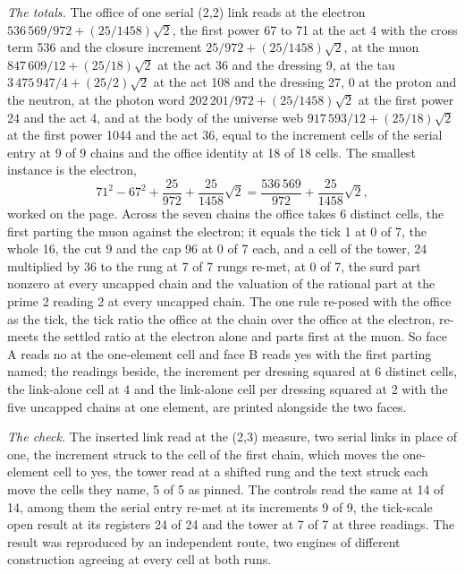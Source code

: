\begin{chproof}
\textit{The totals.} The office of one serial (2,2) link reads at the electron $536\,569/972 + (25/1458)\sqrt{2}$, the first power 67 to 71 at the act 4 with the cross term 536 and the closure increment $25/972 + (25/1458)\sqrt{2}$, at the muon $847\,609/12 + (25/18)\sqrt{2}$ at the act 36 and the dressing 9, at the tau $3\,475\,947/4 + (25/2)\sqrt{2}$ at the act 108 and the dressing 27, 0 at the proton and the neutron, at the photon word $202\,201/972 + (25/1458)\sqrt{2}$ at the first power 24 and the act 4, and at the body of the universe web $917\,593/12 + (25/18)\sqrt{2}$ at the first power 1044 and the act 36, equal to the increment cells of the serial entry at 9 of 9 chains and the office identity at 18 of 18 cells. The smallest instance is the electron,
\begin{equation}
71^2 - 67^2 + \frac{25}{972} + \frac{25}{1458}\sqrt{2} = \frac{536\,569}{972} + \frac{25}{1458}\sqrt{2},
\end{equation}
worked on the page. Across the seven chains the office takes 6 distinct cells, the first parting the muon against the electron; it equals the tick 1 at 0 of 7, the whole 16, the cut 9 and the cap 96 at 0 of 7 each, and a cell of the tower, 24 multiplied by 36 to the rung at 7 of 7 rungs re-met, at 0 of 7, the surd part nonzero at every uncapped chain and the valuation of the rational part at the prime 2 reading 2 at every uncapped chain. The one rule re-posed with the office as the tick, the tick ratio the office at the chain over the office at the electron, re-meets the settled ratio at the electron alone and parts first at the muon. So face A reads no at the one-element cell and face B reads yes with the first parting named; the readings beside, the increment per dressing squared at 6 distinct cells, the link-alone cell at 4 and the link-alone cell per dressing squared at 2 with the five uncapped chains at one element, are printed alongside the two faces.

\textit{The check.} The inserted link read at the (2,3) measure, two serial links in place of one, the increment struck to the cell of the first chain, which moves the one-element cell to yes, the tower read at a shifted rung and the text struck each move the cells they name, 5 of 5 as pinned. The controls read the same at 14 of 14, among them the serial entry re-met at its increments 9 of 9, the tick-scale open result at its registers 24 of 24 and the tower at 7 of 7 at three readings. The result was reproduced by an independent route, two engines of different construction agreeing at every cell at both runs.
\end{chproof}
